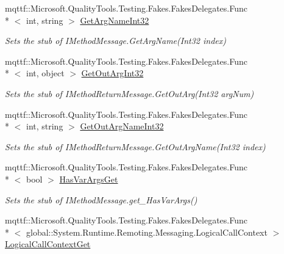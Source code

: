 \begin{DoxyCompactItemize}
mqttf\-::\-Microsoft.\-Quality\-Tools.\-Testing.\-Fakes.\-Fakes\-Delegates.\-Func\\*
$<$ int, string $>$ \hyperlink{class_system_1_1_runtime_1_1_remoting_1_1_activation_1_1_fakes_1_1_stub_i_construction_return_message_a8837b775e4966348e20c7c2ab901d027}{Get\-Arg\-Name\-Int32}
\begin{DoxyCompactList}\small\item\em Sets the stub of I\-Method\-Message.\-Get\-Arg\-Name(\-Int32 index)\end{DoxyCompactList}\item 
mqttf\-::\-Microsoft.\-Quality\-Tools.\-Testing.\-Fakes.\-Fakes\-Delegates.\-Func\\*
$<$ int, object $>$ \hyperlink{class_system_1_1_runtime_1_1_remoting_1_1_activation_1_1_fakes_1_1_stub_i_construction_return_message_aef101e1d177e9e77d112b6a18de32393}{Get\-Out\-Arg\-Int32}
\begin{DoxyCompactList}\small\item\em Sets the stub of I\-Method\-Return\-Message.\-Get\-Out\-Arg(\-Int32 arg\-Num)\end{DoxyCompactList}\item 
mqttf\-::\-Microsoft.\-Quality\-Tools.\-Testing.\-Fakes.\-Fakes\-Delegates.\-Func\\*
$<$ int, string $>$ \hyperlink{class_system_1_1_runtime_1_1_remoting_1_1_activation_1_1_fakes_1_1_stub_i_construction_return_message_a15a713d36d5a7ee71d4771b44f7f030a}{Get\-Out\-Arg\-Name\-Int32}
\begin{DoxyCompactList}\small\item\em Sets the stub of I\-Method\-Return\-Message.\-Get\-Out\-Arg\-Name(\-Int32 index)\end{DoxyCompactList}\item 
mqttf\-::\-Microsoft.\-Quality\-Tools.\-Testing.\-Fakes.\-Fakes\-Delegates.\-Func\\*
$<$ bool $>$ \hyperlink{class_system_1_1_runtime_1_1_remoting_1_1_activation_1_1_fakes_1_1_stub_i_construction_return_message_a501ba7b3705682c10756bf3ea22b233f}{Has\-Var\-Args\-Get}
\begin{DoxyCompactList}\small\item\em Sets the stub of I\-Method\-Message.\-get\-\_\-\-Has\-Var\-Args()\end{DoxyCompactList}\item 
mqttf\-::\-Microsoft.\-Quality\-Tools.\-Testing.\-Fakes.\-Fakes\-Delegates.\-Func\\*
$<$ global\-::\-System.\-Runtime.\-Remoting.\-Messaging.\-Logical\-Call\-Context $>$ \hyperlink{class_system_1_1_runtime_1_1_remoting_1_1_activation_1_1_fakes_1_1_stub_i_construction_return_message_a44d7510dd7d6464208c3ddb230f58649}{Logical\-Call\-Context\-Get}

\end{DoxyCompactItemize}
